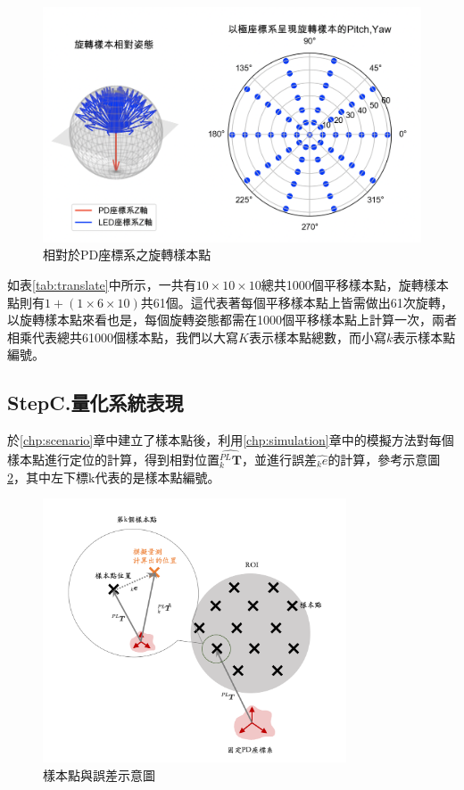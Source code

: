 \begin{figure}[htpb]
    \centering
    \includegraphics[width=12cm]{ch4pic/rotate_sample.png}
    \caption{相對於PD座標系之旋轉樣本點}
    \label{pic:rotate_sample}
\end{figure}


如表\ref{tab:translate}中所示，一共有$10\times 10\times 10$總共1000個平移樣本點，旋轉樣本點則有$1+(1\times 6\times 10)$共61個。這代表著每個平移樣本點上皆需做出61次旋轉，以旋轉樣本點來看也是，每個旋轉姿態都需在1000個平移樣本點上計算一次，兩者相乘代表總共61000個樣本點，我們以大寫$K$表示樣本點總數，而小寫$k$表示樣本點編號。






\subsection{StepC.量化系統表現}
\label{chp:evaluate_method}

於\ref{chp:scenario}章中建立了樣本點後，利用\ref{chp:simulation}章中的模擬方法對每個樣本點進行定位的計算，得到相對位置$\hat{_k^{PL}\boldsymbol{T}}$，並進行誤差$\hat{_k e}$的計算，參考示意圖\ref{pic:error_show}，其中左下標k代表的是樣本點編號。

\begin{figure}[htpb]
    \centering
    \includegraphics[width=9cm]{ch4pic/error.png}
    \caption{樣本點與誤差示意圖}
    \label{pic:error_show}
\end{figure}

